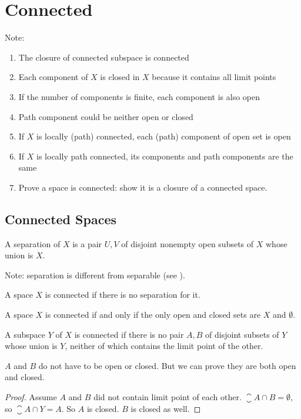 \chapter{Connected}



Note: 
\begin{enumerate}
    \item The closure of connected subspace is connected
    \item Each component of $X$ is closed in $X$ because it contains all limit points
    \item If the number of components is finite, each component is also open
    \item Path component could be neither open or closed
    \item If $X$ is locally (path) connected, each (path) component of open set is open
    \item If $X$ is locally path connected, its components and path components are the same
    \item Prove a space is connected: show it is a closure of a connected space.
\end{enumerate}


\section{Connected Spaces}

\begin{definition}\label{separation}
    A separation of $X$ is a pair $U,V$ of disjoint nonempty open subsets of $X$ whose union is $X$.
    
    
    Note: separation is different from separable (see ).
\end{definition}

\begin{definition}
    A space $X$ is connected if there is no separation for it.
\end{definition}

\begin{theorem}
    A space $X$ is connected if and only if the only open and closed sets are $X$ and $\emptyset$.
\end{theorem}

\begin{theorem}
    A subspace $Y$ of $X$ is connected if there is no pair $A,B$ of disjoint subsets of $Y$ whose union is $Y$, neither of which contains the limit point of the other.
    
    $A$ and $B$ do not have to be open or closed. But we can prove they are both open and closed.
\end{theorem}
\begin{proof}
    Assume $A$ and $B$ did not contain limit point of each other. $\closure{A} \cap B = \emptyset$, so $\closure{A} \cap Y = A$. So $A$ is closed. $B$ is closed as well.
\end{proof}

